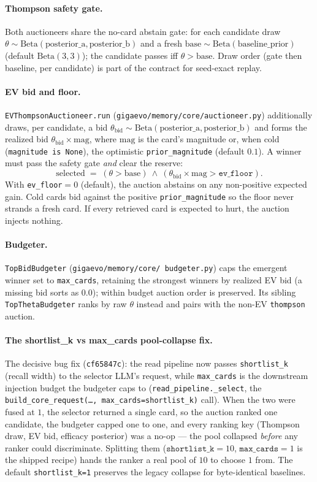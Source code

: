 \documentclass[11pt]{article}
\newcommand{\code}[1]{\texttt{#1}}
\begin{document}
\paragraph{Thompson safety gate.} Both auctioneers share the no-card abstain gate:
for each candidate draw $\theta\sim\mathrm{Beta}(\text{posterior\_a},
\text{posterior\_b})$ and a fresh $\text{base}\sim\mathrm{Beta}(\text{baseline\_
prior})$ (default $\mathrm{Beta}(3,3)$); the candidate passes iff $\theta >
\text{base}$. Draw order (gate then baseline, per candidate) is part of the
contract for seed-exact replay.

\paragraph{EV bid and floor.} \code{EVThompsonAuctioneer.run}
(\code{gigaevo/memory/core/auctioneer.py}) additionally draws, per candidate, a
bid $\theta_{\text{bid}}\sim\mathrm{Beta}(\text{posterior\_a},
\text{posterior\_b})$ and forms the realized bid $\theta_{\text{bid}}\times
\text{mag}$, where $\text{mag}$ is the card's magnitude or, when cold
(\code{magnitude is None}), the optimistic \code{prior\_magnitude} (default
$0.1$). A winner must pass the safety gate \emph{and} clear the reserve:
\[
\text{selected} \;=\; (\theta > \text{base}) \ \land\ (\theta_{\text{bid}}\times\text{mag} > \texttt{ev\_floor}).
\]
With \code{ev\_floor}$=0$ (default), the auction abstains on any non-positive
expected gain. Cold cards bid against the positive \code{prior\_magnitude} so the
floor never strands a fresh card. If every retrieved card is expected to hurt, the
auction injects nothing.

\paragraph{Budgeter.} \code{TopBidBudgeter} (\code{gigaevo/memory/core/
budgeter.py}) caps the emergent winner set to \code{max\_cards}, retaining the
strongest winners by realized EV bid (a missing bid sorts as $0.0$); within budget
auction order is preserved. Its sibling \code{TopThetaBudgeter} ranks by raw
$\theta$ instead and pairs with the non-EV \code{thompson} auction.

\paragraph{The shortlist\_k vs max\_cards pool-collapse fix.} The decisive bug fix
(\code{cf65847c}): the read pipeline now passes \code{shortlist\_k} (recall width)
to the selector LLM's request, while \code{max\_cards} is the downstream injection
budget the budgeter caps to (\code{read\_pipeline.\_select}, the
\code{build\_core\_request(\ldots, max\_cards=shortlist\_k)} call). When the two
were fused at $1$, the selector returned a single card, so the auction ranked one
candidate, the budgeter capped one to one, and every ranking key (Thompson draw,
EV bid, efficacy posterior) was a no-op --- the pool collapsed \emph{before} any
ranker could discriminate. Splitting them ($\code{shortlist\_k}=10$,
$\code{max\_cards}=1$ is the shipped recipe) hands the ranker a real pool of $10$
to choose $1$ from. The default \code{shortlist\_k=1} preserves the legacy collapse
for byte-identical baselines.
\end{document}
